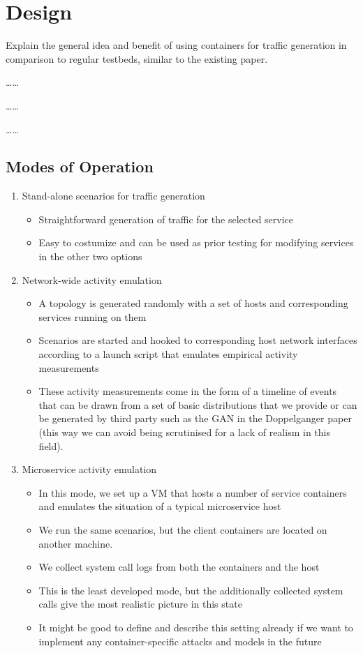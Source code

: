 \documentclass{article}
\begin{document}
\section{Design}\label{Sec:Design}

Explain the general idea and benefit of using containers for traffic generation in comparison to regular testbeds, similar to the existing paper.

\dots \dots

\dots \dots

\dots \dots
\subsection{Modes of Operation}

\begin{enumerate}
\item Stand-alone scenarios for traffic generation
\begin{itemize}
\item Straightforward generation of traffic for the selected service
\item Easy to costumize and can be used as prior testing for modifying services in the other two options
\end{itemize}
\item Network-wide activity emulation
\begin{itemize}
\item A topology is generated randomly with a set of hosts and corresponding services running on them
\item Scenarios are started and hooked to corresponding host network interfaces according to a launch script that emulates empirical activity measurements
\item These activity measurements come in the form of a timeline of events that can be drawn from a set of basic distributions that we provide or can be generated by third party such as the GAN in the Doppelganger paper (this way we can avoid being scrutinised for a lack of realism in this field).
\end{itemize}


\item Microservice activity emulation
\begin{itemize}
\item In this mode, we set up a VM that hosts a number of service containers and emulates the situation of a typical microservice host
\item We run the same scenarios, but the client containers are located on another machine. 
\item We collect system call logs from both the containers and the host
\item This is the least developed mode, but the additionally collected system calls give the most realistic picture in this state
\item It might be good to define and describe this setting already if we want to implement any container-specific attacks and models in the future
\end{itemize}

\end{enumerate}
\end{document}

